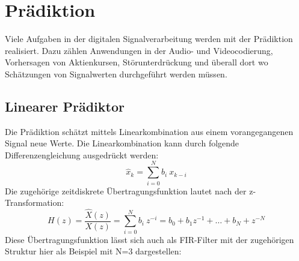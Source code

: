 \documentclass[
    10pt, %
    DIV12,
    english, %
    a5paper, %
    twoside, %
    titlepage, %
    parskip=half, %
    headings=small, %
    listof=totoc, %
    bibliography=totoc, %
    index=totoc, %
    captions=tableheading, %
    final %
]{scrbook}
\begin{document}
\tableofcontents 

\newpage

\chapter{Prädiktion}
Viele Aufgaben in der digitalen Signalverarbeitung werden mit der Prädiktion realisiert. Dazu zählen Anwendungen in der Audio- und Videocodierung, Vorhersagen von Aktienkursen, 
Störunterdrückung und überall dort wo Schätzungen von Signalwerten durchgeführt werden müssen.

\section{Linearer Prädiktor}
Die Prädiktion schätzt mittels Linearkombination aus einem vorangegangenen Signal neue Werte. Die Linearkombination kann 
durch folgende Differenzengleichung ausgedrückt werden:
\begin{equation}\label{linearcombination}
\hat{x}_k=\sum_{i=0}^{N} b_i\:x_{k-i}
\end{equation}
Die zugehörige zeitdiskrete Übertragungsfunktion lautet nach der z-Transformation:
\begin{equation}
H(z)=\frac{\hat{X}(z)}{X(z)}=\sum_{i=0}^{N} b_i\:z^{-i}=b_0+b_1z^{-1}+\dots+b_N+z^{-N}\nonumber
\end{equation}
Diese Übertragungsfunktion lässt sich auch als FIR-Filter mit der zugehörigen Struktur hier als Beispiel mit N=3 dargestellen:\\
\end{document}
